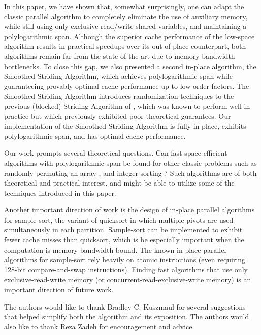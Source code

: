 \documentclass[sigplan, 10pt, nonacm]{acmart}
\renewcommand{\paragraph}[1]{\vspace{0.09in}\noindent{\bf \boldmath #1.}}
\theoremstyle{remark}
\theoremstyle{remark}
\begin{document}
In this paper, we have shown that, somewhat surprisingly, one can
adapt the classic parallel algorithm to completely eliminate the use
of auxiliary memory, while still using only exclusive read/write
shared variables, and maintaining a polylogarithmic span. Although the
superior cache performance of the low-space algorithm results in
practical speedups over its out-of-place counterpart, both algorithms
remain far from the state-of-the art due to memory bandwidth bottlenecks. To close this gap, we also
presented a second in-place algorithm, the Smoothed Striding
Algorithm, which achieves polylogarithmic span while guaranteeing
provably optimal cache performance up to low-order factors. The
Smoothed Striding Algorithm introduces randomization techniques to the
previous (blocked) Striding Algorithm of \cite{Frias08, FrancisPa92},
which was known to perform well in practice but which previously
exhibited poor theoretical guarantees. Our implementation of the
Smoothed Striding Algorithm is fully in-place, exhibits
polylogarithmic span, and has optimal cache performance.

Our work prompts several theoretical questions. Can fast
space-efficient algorithms with polylogarithmic span be found for
other classic problems such as randomly permuting an array
\cite{Anderson90, AlonsoSc96, ShunGu15}, and integer sorting
\cite{Rajasekaran92, HanHe12, AlbersHa97, Han01, GerbessiotisSi04}?
Such algorithms are of both theoretical and practical interest, and
might be able to utilize some of the techniques introduced in this
paper.

Another important direction of work is the design of in-place parallel
algorithms for sample-sort, the variant of quicksort in which multiple
pivots are used simultaneously in each partition. Sample-sort can be
implemented to exhibit fewer cache misses than quicksort, which is be
especially important when the computation is memory-bandwidth
bound. The known in-place parallel algorithms for sample-sort rely
heavily on atomic instructions \cite{AxtmannWi17} (even requiring
128-bit compare-and-swap instructions). Finding fast algorithms that
use only exclusive-read-write memory (or
concurrent-read-exclusive-write memory) is an important direction of
future work.


\paragraph{Acknowledgments} The authors would like to thank Bradley C. Kuszmaul for several suggestions that helped simplify both the algorithm and its exposition. The authors would also like to thank Reza Zadeh for encouragement and advice.
\end{document}
